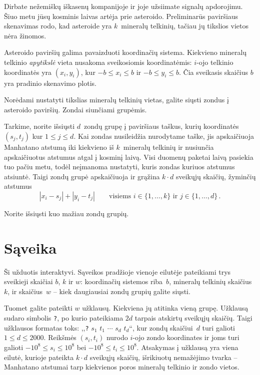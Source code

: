 

\noindent
Dirbate nežemiškų iškasenų kompanijoje ir joje užsiimate signalų apdorojimu. 
Šiuo metu jūsų kosminis laivas artėja prie asteroido.
Preliminarūs paviršiaus skenavimas rodo, kad asteroide yra $k$~mineralų telkinių, tačiau jų tikslios vietos nėra žinomos.

\medskip

Asteroido paviršių galima pavaizduoti koordinačių sistema.
Kiekvieno mineralų telkinio \textit{apytikslė} vieta nusakoma sveikosiomis koordinatėmis:
$i$-ojo telkinio koordinatės yra $(x_i, y_i)$, kur
$-b \le x_i \le b$ ir $-b\le y_i \le b$. %
Čia sveikasis skaičius $b$ yra pradinio skenavimo plotis.

Norėdami nustatyti tikslias mineralų telkinių vietas, galite siųsti zondus į asteroido paviršių.
Zondai siunčiami grupėmis.

Tarkime, norite išsiųsti $d$~zondų grupę į paviršiaus taškus, kurių koordinatės $(s_j,t_j)$ kur $1\leq j\leq d$.
Kai zondas nusileidžia nurodytame taške, 
jis apskaičiuoja Manhatano atstumą iki kiekvieno iš $k$~mineralų telkinių
ir nusiunčia apskaičiuotus atstumus atgal į kosminį laivą.
Visi duomenų paketai laivą pasiekia tuo pačiu metu, todėl neįmanoma nustatyti, kuris zondas kuriuos atstumus atsiuntė.
Taigi zondų grupė apskaičiuoja ir grąžina $k\cdot d$ sveikųjų skaičių, žyminčių atstumus
\[|x_i-s_j| + |y_i - t_j| \qquad\text{visiems } i \in \{1,\ldots,k\} \text{ ir } j \in\{ 1,\ldots,d\}\,.\]

Norite išsiųsti kuo mažiau zondų grupių.


\section*{Sąveika}

Ši užduotis interaktyvi.
Sąveikos pradžioje vienoje eilutėje pateikiami trys sveikieji skaičiai $b$, $k$ ir $w$:
koordinačių sistemos riba~$b$,
mineralų telkinių skaičius~$k$,
ir skaičius~$w$ -- kiek daugiausiai zondų grupių galite siųsti.

Tuomet galite pateikti $w$ užklausų. Kiekviena jų atitinka vieną grupę.
Užklausą sudaro simbolis \texttt{?}, po kurio pateikiama $2d$ tarpais atskirtų sveikųjų skaičių.
Taigi užklausos formatas toks: ,,\texttt{?} $s_1$ $t_1$ $\cdots$ $s_d$ $t_d$``, kur zondų skaičiui~$d$ turi galioti
$1\leq d\leq 2000$. %
Reikšmės $(s_i,t_i)$ nurodo $i$-ojo zondo koordinates ir joms turi galioti
$-10^8 \leq s_i \leq 10^8$ bei $-10^8 \leq t_i \leq 10^8$. %
Atsakymas į užklausą yra viena eilutė, kurioje pateikta $k \cdot d$ sveikųjų skaičių, išrikiuotų nemažėjimo tvarka -- 
Manhatano atstumai tarp kiekvienos poros mineralų telkinio ir zondo vietos.

